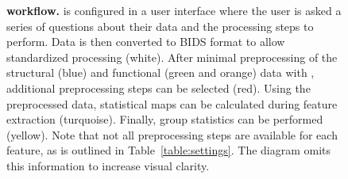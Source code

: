\begin{figure}[!tb]
\begin{adjustwidth}{-2.4cm}{}
        \caption{\textbf{ workflow.}  is configured in a user interface where the user is asked a series of questions about their data and the processing steps to perform. Data is then converted to BIDS format \parencite{gorgolewski2016b} to allow standardized processing (white). After minimal preprocessing of the structural (blue) and functional (green and orange) data with  \parencite{esteban2019a}, additional preprocessing steps can be selected (red). Using the preprocessed data, statistical maps can be calculated during feature extraction (turquoise). Finally, group statistics can be performed (yellow). Note that not all preprocessing steps are available for each feature, as is outlined in Table~\ref{table:settings}. The diagram omits this information to increase visual clarity.}\label{fig:workflow}
  \end{adjustwidth}
\end{figure}
